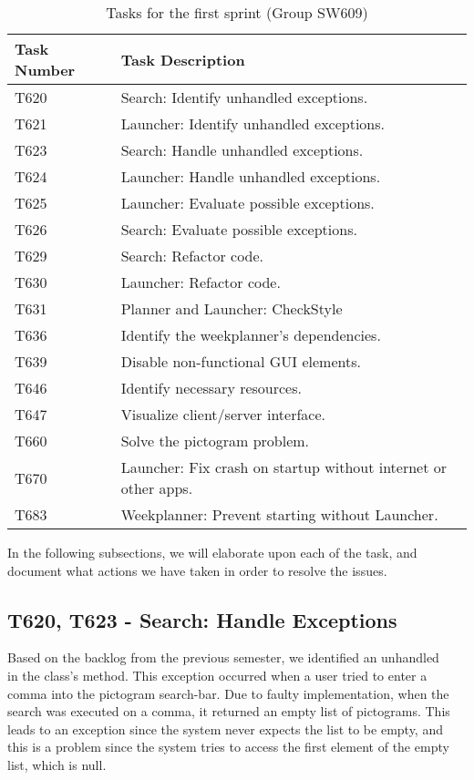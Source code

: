 \begin{table}[H]
\centering
\begin{tabular}{|l|l|}
\hline
Task Number		& Task Description 												\\\hline
T620  			& Search: Identify unhandled exceptions.                 		\\\hline
T621    	   	& Launcher: Identify unhandled exceptions. 						\\\hline 
T623	       	& Search: Handle unhandled exceptions.                 			\\\hline
T624    	   	& Launcher: Handle unhandled exceptions.  						\\\hline
T625   	   		& Launcher: Evaluate possible exceptions.        				\\\hline
T626   	   		& Search: Evaluate possible exceptions.                			\\\hline
T629  	   		& Search: Refactor code.			   							\\\hline
T630       		& Launcher: Refactor code.                 						\\\hline
T631       		& Planner and Launcher: CheckStyle                 				\\\hline
T636			& Identify the weekplanner's dependencies.						\\\hline
T639       		& Disable non-functional GUI elements.               			\\\hline
T646       		& Identify necessary resources.                 				\\\hline 
T647       		& Visualize client/server interface.                 			\\\hline 
T660       		& Solve the pictogram problem.                 					\\\hline
T670       		& Launcher: Fix crash on startup without internet or other apps.\\\hline 
T683			& Weekplanner: Prevent starting without Launcher.				\\\hline
\end{tabular}
\caption{Tasks for the first sprint (Group SW609)} 
\label{SprintOneTasks}    
\end{table} 

In the following subsections, we will elaborate upon each of the task, and
document what actions we have taken in order to resolve the issues. 

\subsection{T620, T623 - Search: Handle Exceptions}
Based on the backlog from the previous semester, we identified an unhandled
\\ in the  class's
 method. This exception occurred when a user tried to enter a
comma into the pictogram search-bar. Due to faulty implementation, when the
search was executed on a comma, it returned an empty list of pictograms.
This leads to an exception since the system never expects the list to be empty,
and this is a problem since the system tries to access the first element of the
empty list, which is null.\nl

